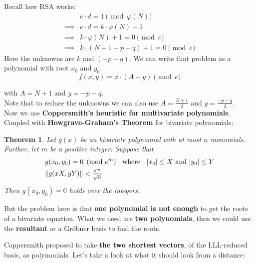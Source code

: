 \documentclass[a4paper,11pt]{article}
\newtheorem{theorem}{Theorem}
\begin{document}
Recall how RSA works:
\begin{align*}
&e \cdot d = 1 \pmod{\varphi(N)}\\
\implies& e \cdot d = k \cdot \varphi(N) + 1\\
\implies& k \cdot \varphi(N) + 1 = 0 \pmod{e}\\
\implies& k \cdot (N + 1 - p - q) + 1 = 0 \pmod{e}
\end{align*}
Here the unknowns are $k$ and $(-p-q)$. We can write that problem as a polynomial with root $x_0$ and $y_0$:
\[ f(x,y) = x \cdot (A + y) \pmod{e} \]

with $A = N + 1$ and $y = -p -q$.\\
Note that to reduce the unknowns we can also use $A = \frac{N + 1}{2}$ and $y = \frac{-p-q}{2}$.\\

Now we use \textbf{Coppersmith's heuristic for multivariate polynomials}. Coupled with \textbf{Howgrave-Graham's Theorem} for bivariate polynomials:

\begin{theorem}
Let $g(x)$ be an bivariate polynomial with at most $n$ monomials. Further, let $m$ be a positive integer. Suppose that
\setcounter{equation}{0}
\begin{align}
&g(x_0,y_0) = 0 \pmod{e^m} \hspace{2mm} \text{ where } \hspace{2mm} |x_0| \leq X \text{ and } |y_0| \leq Y\\
&\|g(xX,yY)\| < \frac{_{e^m}}{^{\sqrt{n}}}
\end{align}
Then $g(x_0,y_0)=0$ holds over the integers.\\
\end{theorem}

But the problem here is that \textbf{one polynomial is not enough} to get the roots of a bivariate equation. What we need are \textbf{two polynomials}, then we could use the \textbf{resultant} or a Gröbner basis to find the roots.

Coppersmith proposed to take \textbf{the two shortest vectors}, of the LLL-reduced basis, as polynomials. Let's take a look at what it should look from a distance:\\
\end{document}
